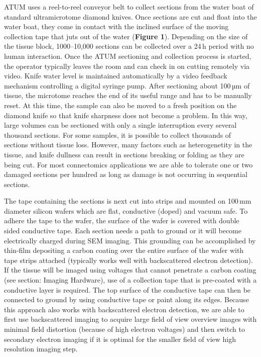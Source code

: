 \documentclass{article}
\begin{document}
ATUM uses a reel-to-reel conveyor belt to collect sections from the water boat of standard ultramicrotome diamond knives. Once sections are cut and float into the water boat, they come in contact with the inclined surface of the moving collection tape that juts out of the water (\textbf{Figure 1}). Depending on the size of the tissue block, 1000–10,000 sections can be collected over a 24\,h period with no human interaction. Once the ATUM sectioning and collection process is started, the operator typically leaves the room and can check in on cutting remotely via video. Knife water level is maintained automatically by a video feedback mechanism controlling a digital syringe pump. After sectioning about 100\,µm of tissue, the microtome reaches the end of its useful range and has to be manually reset. At this time, the sample can also be moved to a fresh position on the diamond knife so that knife sharpness does not become a problem. In this way, large volumes can be sectioned with only a single interruption every several thousand sections. For some samples, it is possible to collect thousands of sections without tissue loss. However, many factors such as heterogenetity in the tissue, and knife dullness can result in sections breaking or folding as they are being cut. For most connectomics applications we are able to tolerate one or two damaged sections per hundred as long as damage is not occurring in sequential sections.

The tape containing the sections is next cut into strips and mounted on 100\,mm diameter silicon wafers which are flat, conductive (doped) and vacuum safe. To adhere the tape to the wafer, the surface of the wafer is covered with double sided conductive tape. Each section needs a path to ground or it will become electrically charged during SEM imaging. This grounding can be accomplished by thin-film depositing a carbon coating over the entire surface of the wafer with tape strips attached (typically works well with backscattered electron detection). If the tissue will be imaged using voltages that cannot penetrate a carbon coating (see section: Imaging Hardware), use of a collection tape that is pre-coated with a conductive layer is required. The top surface of the conductive tape can then be connected to ground by using conductive tape or paint along its edges. Because this approach also works with backscattered electron detection, we are able to first use backscattered imaging to acquire large field of view overview images with minimal field distortion (because of high electron voltages) and then switch to secondary electron imaging if it is optimal for the smaller field of view high resolution imaging step.
\end{document}

